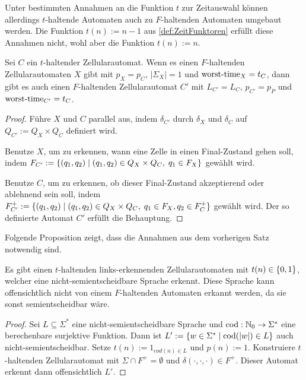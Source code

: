 Unter bestimmten Annahmen an die Funktion $t$ zur Zeitauswahl können allerdings $t$-haltende Automaten auch zu $F$-haltenden Automaten umgebaut werden. Die Funktion $t(n) := n - 1$ aus \cref{def:ZeitFunktoren} erfüllt diese Annahmen nicht, wohl aber die Funktion $t(n) := n$.

\begin{satz}
    Sei $C$ ein $t$-haltender Zellularautomat.
    Wenn es einen $F$-haltenden Zellularautomaten $X$ gibt
    mit $p_X = p_C$, $|\Sigma_X| = 1$ und $\operatorname{worst-time}_X = t_C$,
    dann gibt es auch einen $F$-haltenden Zellularautomat $C'$ mit $L_{C'} = L_C$, $p_{C'} = p_P$ und $\operatorname{worst-time}_{C'} = t_C$.
\end{satz}
\begin{proof}
    Führe $X$ und $C$ parallel aus, indem $\delta_{C'}$ durch $\delta_X$ und $\delta_C$ auf $Q_{C'} := Q_X \times Q_C$ definiert wird.
    
    Benutze $X$, um zu erkennen, wann eine Zelle in einen Final-Zustand gehen soll,
    indem $F_{C'} := \{ { (q_1, q_2) } \; | \; { (q_1, q_2) \in Q_X \times Q_C, \; q_1 \in F_X } \} $ gewählt wird.
    
    Benutze $C$, um zu erkennen, ob dieser Final-Zustand akzeptierend oder ablehnend sein soll,
    indem $F_{C'}^+ := \{ { (q_1, q_2) } \; | \; { (q_1, q_2) \in Q_X \times Q_C, \; q_1 \in F_X, q_2 \in F_C^+} \} $ gewählt wird.
    Der so definierte Automat $C'$ erfüllt die Behauptung.
\end{proof}

Folgende Proposition zeigt, dass die Annahmen aus dem vorherigen Satz notwendig sind.

\begin{proposition}
    Es gibt einen $t$-haltenden links-erkennenden Zellularautomaten mit
    $t(n) \in \{ {0, 1} \}$,
    welcher eine nicht-semientscheidbare Sprache erkennt.
    Diese Sprache kann offensichtlich nicht
    von einem $F$-haltenden Automaten erkannt werden,
    da sie sonst semientscheidbar wäre.
\end{proposition}
\begin{proof}
    Sei $L \subseteq \Sigma^*$ eine nicht-semientscheidbare Sprache und $\mathrm{cod}: \mathbb{N}_0 \to \Sigma^*$ eine berechenbare surjektive Funktion.
    Dann ist $L' := \{ { w \in \Sigma^* } \; | \; { \mathrm{cod}(|w|) \in L } \}$ auch nicht-semientscheidbar.
    Setze $t(n) := 1_{cod(n) \in L}$ und $p(n) := 1$.
    Konstruiere $t$-haltenden Zellularautomat mit $\Sigma \cap F^+ = \emptyset$ und $\delta(\cdot, \cdot, \cdot) \in F^+$.
    Dieser Automat erkennt dann offensichtlich $L'$.
\end{proof}

